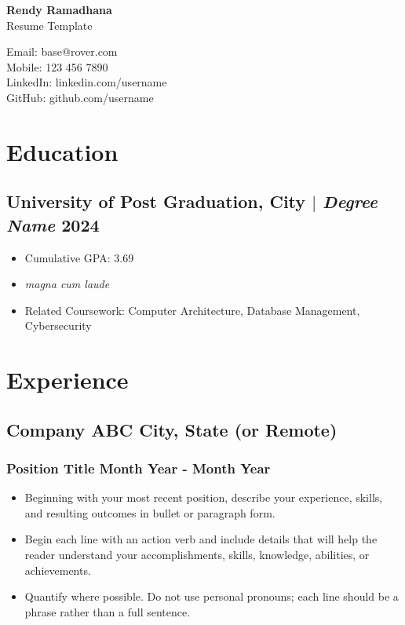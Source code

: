 \documentclass[11pt]{article} %
\begin{document}
\begin{center}
	\begin{minipage}{0.5\textwidth}
		{\Huge\bfseries
			\hfill Rendy Ramadhana \hfill %
		} \\ \medskip
		Resume Template %
	\end{minipage} \hfill
	\begin{minipage}{0.4\textwidth}
		\raggedleft
		Email: base@rover.com \\
		Mobile: 123 456 7890 \\
		LinkedIn: linkedin.com/username \\
		GitHub: github.com/username
	\end{minipage}
\end{center}

\section{Education}
\subsection{University of Post Graduation, City $|$ {\normalfont\itshape Degree Name} \hfill 2024}
\begin{itemize}
	\item Cumulative GPA: 3.69
	\item \textit{magna cum laude} 
  \item Related Coursework: Computer Architecture, Database Management, Cybersecurity
\end{itemize}

\section{Experience}
\subsection{Company ABC \hfill City, State (or Remote)}
\subsubsection{Position Title \hfill  Month Year - Month Year}
\begin{itemize}
	\item Beginning with your most recent position, describe your experience, skills, and resulting outcomes in bullet or paragraph form.
	\item Begin each line with an action verb and include details that will help the reader understand your accomplishments, skills, knowledge, abilities, or achievements.
	\item Quantify where possible. Do not use personal pronouns; each line should be a phrase rather than a full sentence.
\end{itemize}
\end{document}
